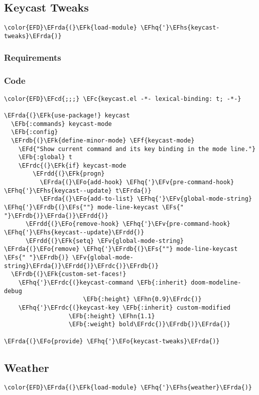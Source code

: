 \documentclass[a4wide,10pt]{article}
\newcommand{\EFc}[1]{\textcolor{EFc}{#1}} %
\newcommand{\EFcd}[1]{\textcolor{EFcd}{#1}} %
\newcommand{\EFs}[1]{\textcolor{EFs}{#1}} %
\newcommand{\EFd}[1]{\textcolor{EFd}{#1}} %
\newcommand{\EFk}[1]{\textcolor{EFk}{#1}} %
\newcommand{\EFb}[1]{\textcolor{EFb}{#1}} %
\newcommand{\EFf}[1]{\textcolor{EFf}{#1}} %
\newcommand{\EFv}[1]{\textcolor{EFv}{#1}} %
\newcommand{\EFo}[1]{\textcolor{EFo}{#1}} %
\newcommand{\EFhn}[1]{\textcolor{EFhn}{\textbf{#1}}} %
\newcommand{\EFhq}[1]{\textcolor{EFhq}{#1}} %
\newcommand{\EFhs}[1]{\textcolor{EFhs}{#1}} %
\newcommand{\EFrda}[1]{\textcolor{EFrda}{#1}} %
\newcommand{\EFrdb}[1]{\textcolor{EFrdb}{#1}} %
\newcommand{\EFrdc}[1]{\textcolor{EFrdc}{#1}} %
\newcommand{\EFrdd}[1]{\textcolor{EFrdd}{#1}} %
\begin{document}
\subsection{Keycast Tweaks}
\label{sec:org4b0f435}
\begin{Code}
\begin{Verbatim}
\color{EFD}\EFrda{(}\EFk{load-module} \EFhq{'}\EFhs{keycast-tweaks}\EFrda{)}
\end{Verbatim}
\end{Code}
\subsubsection{Requirements}
\label{sec:org8601133}
\subsubsection{Code}
\label{sec:org2b14670}
\begin{Code}
\begin{Verbatim}
\color{EFD}\EFcd{;;;} \EFc{keycast.el -*- lexical-binding: t; -*-}

\EFrda{(}\EFk{use-package!} keycast
  \EFb{:commands} keycast-mode
  \EFb{:config}
  \EFrdb{(}\EFk{define-minor-mode} \EFf{keycast-mode}
    \EFd{"Show current command and its key binding in the mode line."}
    \EFb{:global} t
    \EFrdc{(}\EFk{if} keycast-mode
        \EFrdd{(}\EFk{progn}
          \EFrda{(}\EFo{add-hook} \EFhq{'}\EFv{pre-command-hook} \EFhq{'}\EFhs{keycast--update} t\EFrda{)}
          \EFrda{(}\EFo{add-to-list} \EFhq{'}\EFv{global-mode-string} \EFhq{'}\EFrdb{(}\EFs{""} mode-line-keycast \EFs{" "}\EFrdb{)}\EFrda{)}\EFrdd{)}
      \EFrdd{(}\EFo{remove-hook} \EFhq{'}\EFv{pre-command-hook} \EFhq{'}\EFhs{keycast--update}\EFrdd{)}
      \EFrdd{(}\EFk{setq} \EFv{global-mode-string} \EFrda{(}\EFo{remove} \EFhq{'}\EFrdb{(}\EFs{""} mode-line-keycast \EFs{" "}\EFrdb{)} \EFv{global-mode-string}\EFrda{)}\EFrdd{)}\EFrdc{)}\EFrdb{)}
  \EFrdb{(}\EFk{custom-set-faces!}
    \EFhq{'}\EFrdc{(}keycast-command \EFb{:inherit} doom-modeline-debug
                      \EFb{:height} \EFhn{0.9}\EFrdc{)}
    \EFhq{'}\EFrdc{(}keycast-key \EFb{:inherit} custom-modified
                  \EFb{:height} \EFhn{1.1}
                  \EFb{:weight} bold\EFrdc{)}\EFrdb{)}\EFrda{)}

\EFrda{(}\EFo{provide} \EFhq{'}\EFo{keycast-tweaks}\EFrda{)}
\end{Verbatim}
\end{Code}
\subsection{Weather}
\label{sec:orge89fd92}
\begin{Code}
\begin{Verbatim}
\color{EFD}\EFrda{(}\EFk{load-module} \EFhq{'}\EFhs{weather}\EFrda{)}
\end{Verbatim}
\end{Code}
\end{document}
